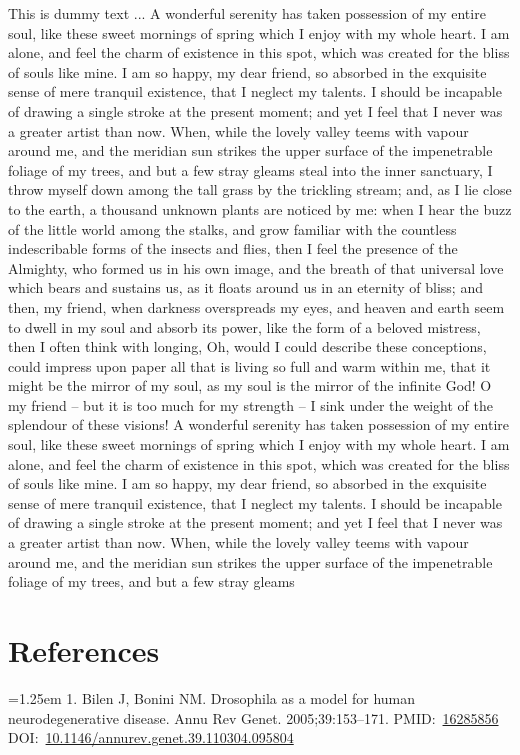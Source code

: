 \documentclass[letterpaper,oneside,11pt]{book}
\begin{document}
This is dummy text ... A wonderful serenity has taken possession of my entire soul, like these sweet mornings of spring which I enjoy with my whole heart. I am alone, and feel the charm of existence in this spot, which was created for the bliss of souls like mine. I am so happy, my dear friend, so absorbed in the exquisite sense of mere tranquil existence, that I neglect my talents. I should be incapable of drawing a single stroke at the present moment; and yet I feel that I never was a greater artist than now. When, while the lovely valley teems with vapour around me, and the meridian sun strikes the upper surface of the impenetrable foliage of my trees, and but a few stray gleams steal into the inner sanctuary, I throw myself down among the tall grass by the trickling stream; and, as I lie close to the earth, a thousand unknown plants are noticed by me: when I hear the buzz of the little world among the stalks, and grow familiar with the countless indescribable forms of the insects and flies, then I feel the presence of the Almighty, who formed us in his own image, and the breath of that universal love which bears and sustains us, as it floats around us in an eternity of bliss; and then, my friend, when darkness overspreads my eyes, and heaven and earth seem to dwell in my soul and absorb its power, like the form of a beloved mistress, then I often think with longing, Oh, would I could describe these conceptions, could impress upon paper all that is living so full and warm within me, that it might be the mirror of my soul, as my soul is the mirror of the infinite God! O my friend -- but it is too much for my strength -- I sink under the weight of the splendour of these visions! A wonderful serenity has taken possession of my entire soul, like these sweet mornings of spring which I enjoy with my whole heart. I am alone, and feel the charm of existence in this spot, which was created for the bliss of souls like mine. I am so happy, my dear friend, so absorbed in the exquisite sense of mere tranquil existence, that I neglect my talents. I should be incapable of drawing a single stroke at the present moment; and yet I feel that I never was a greater artist than now. When, while the lovely valley teems with vapour around me, and the meridian sun strikes the upper surface of the impenetrable foliage of my trees, and but a few stray gleams


\chapter{References}
\setlength{\parindent}{0pt} %
\small
\beginsinglespace
\raggedright
\setlength{\parskip}{0.3cm}
\hangindent=1.25em 
\hypertarget{ref-Bilen2005}{}
1. Bilen J, Bonini NM. Drosophila as a model for human neurodegenerative disease. Annu Rev Genet. 2005;39:153–171. PMID: \href{http://www.ncbi.nlm.nih.gov/pubmed/16285856}{16285856} DOI: \href{https://doi.org/10.1146/annurev.genet.39.110304.095804}{10.1146/annurev.genet.39.110304.095804} 
\end{document}
